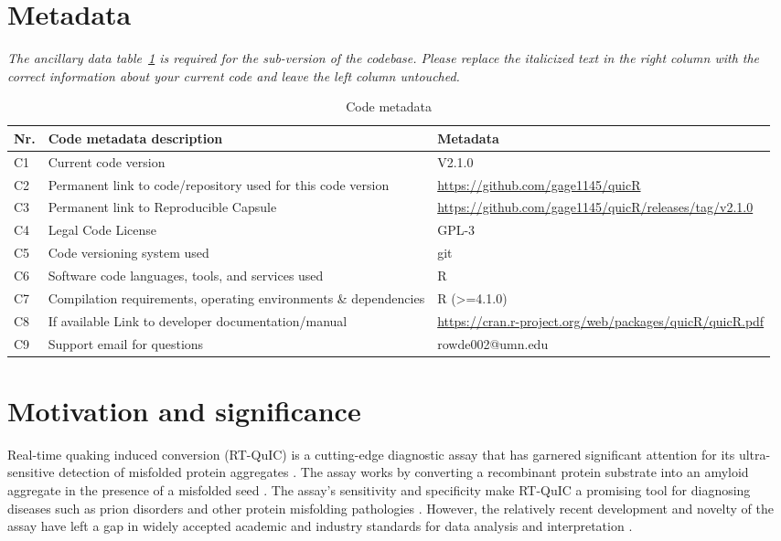 \documentclass[preprint,12pt, a4paper]{elsarticle}
\begin{document}

\section*{Metadata}
\label{}
\textit{The ancillary data table~\ref{codeMetadata} is required for the sub-version of the codebase. Please replace the italicized text in the right column with the correct information about your current code and leave the left column untouched.}

\begin{table}[ht]
\begin{tabular}{|l|p{6.5cm}|p{6.5cm}|}
\hline
\textbf{Nr.} & \textbf{Code metadata description} & \textbf{Metadata} \\
\hline
C1 & Current code version & V2.1.0 \\
\hline
C2 & Permanent link to code/repository used for this code version & \url{https://github.com/gage1145/quicR} \\
\hline
C3  & Permanent link to Reproducible Capsule & \url{https://github.com/gage1145/quicR/releases/tag/v2.1.0}\\
\hline
C4 & Legal Code License   & GPL-3 \\
\hline
C5 & Code versioning system used & git \\
\hline
C6 & Software code languages, tools, and services used & R \\
\hline
C7 & Compilation requirements, operating environments \& dependencies & R (>=4.1.0) \\
\hline
C8 & If available Link to developer documentation/manual & \url{https://cran.r-project.org/web/packages/quicR/quicR.pdf} \\
\hline
C9 & Support email for questions & rowde002@umn.edu\\
\hline
\end{tabular}
\caption{Code metadata}
\label{codeMetadata} 
\end{table}


\section{Motivation and significance}
    Real-time quaking induced conversion (RT-QuIC) is a cutting-edge diagnostic assay that has garnered significant attention for its ultra-sensitive detection of misfolded protein aggregates \cite{Wilham2010, Atarashi2011}. The assay works by converting a recombinant protein substrate into an amyloid aggregate in the presence of a misfolded seed \cite{Wilham2010, Orru2012, Orru2017, Orru2015, Bongianni2019, Dassanayake2016, Hwang2018, Groveman2018, Metrick2020}. The assay's sensitivity and specificity make RT-QuIC a promising tool for diagnosing diseases such as prion disorders and other protein misfolding pathologies \cite{Fiorini2020, Franceschini2017, Picasso-Risso2022, Holz2021}. However, the relatively recent development and novelty of the assay have left a gap in widely accepted academic and industry standards for data analysis and interpretation \cite{Rowden2023}.
\end{document}
